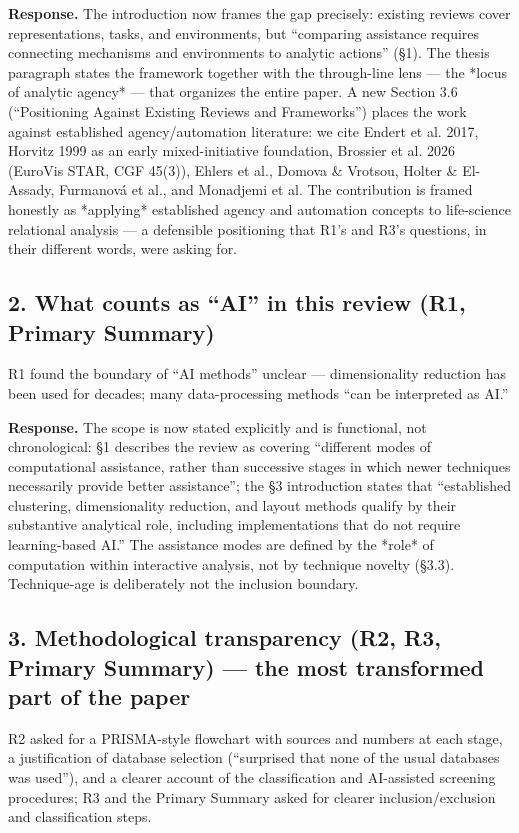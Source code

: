 \documentclass[11pt]{article}
\begin{document}
\textbf{Response.} The introduction now frames the gap precisely: existing reviews cover representations, tasks, and environments, but ``comparing assistance requires connecting mechanisms and environments to analytic actions'' (\S1). The thesis paragraph states the framework together with the through-line lens — the *locus of analytic agency* — that organizes the entire paper. A new Section 3.6 (``Positioning Against Existing Reviews and Frameworks'') places the work against established agency/automation literature: we cite Endert et al. 2017, Horvitz 1999 as an early mixed-initiative foundation, Brossier et al. 2026 (EuroVis STAR, CGF 45(3)), Ehlers et al., Domova \& Vrotsou, Holter \& El-Assady, Furmanová et al., and Monadjemi et al. The contribution is framed honestly as *applying* established agency and automation concepts to life-science relational analysis — a defensible positioning that R1's and R3's questions, in their different words, were asking for.

\subsection*{2. What counts as ``AI'' in this review (R1, Primary Summary)}

R1 found the boundary of ``AI methods'' unclear — dimensionality reduction has been used for decades; many data-processing methods ``can be interpreted as AI.''

\textbf{Response.} The scope is now stated explicitly and is functional, not chronological: \S1 describes the review as covering ``different modes of computational assistance, rather than successive stages in which newer techniques necessarily provide better assistance''; the \S3 introduction states that ``established clustering, dimensionality reduction, and layout methods qualify by their substantive analytical role, including implementations that do not require learning-based AI.'' The assistance modes are defined by the *role* of computation within interactive analysis, not by technique novelty (\S3.3). Technique-age is deliberately not the inclusion boundary.

\subsection*{3. Methodological transparency (R2, R3, Primary Summary) — the most transformed part of the paper}

R2 asked for a PRISMA-style flowchart with sources and numbers at each stage, a justification of database selection (``surprised that none of the usual databases was used''), and a clearer account of the classification and AI-assisted screening procedures; R3 and the Primary Summary asked for clearer inclusion/exclusion and classification steps.
\end{document}
